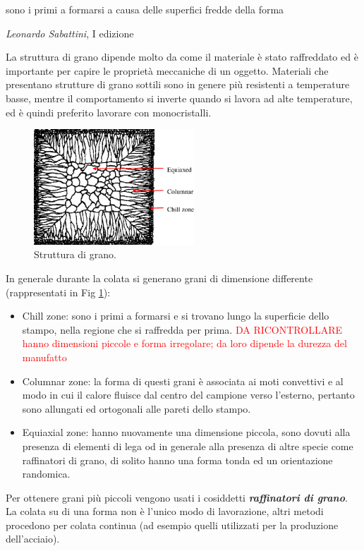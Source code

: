 \epigraph{sono i primi a formarsi a causa delle superfici fredde della forma}{\textit{Leonardo Sabattini}, I edizione}

La struttura di grano dipende molto da come il materiale è stato raffreddato ed è importante per capire le proprietà meccaniche di un oggetto. Materiali che presentano strutture di grano sottili sono in genere più resistenti a temperature basse, mentre il comportamento si inverte quando si lavora ad alte temperature, ed è quindi preferito lavorare con monocristalli.
\begin{figure}[h]
    \centering
    \includegraphics[width=6cm]{struttura/colata_grain.png}
    \caption{Struttura di grano.}
    \label{colata}
\end{figure}
In generale durante la colata si generano grani di dimensione differente (rappresentati in Fig \ref{colata}):
\begin{itemize}
    \item Chill zone: sono i primi a formarsi e si trovano lungo la superficie dello stampo, nella regione che si raffredda per prima. \textcolor{red}{DA RICONTROLLARE hanno dimensioni piccole e forma irregolare; da loro dipende la durezza del manufatto}
    \item Columnar zone: la forma di questi grani è associata ai moti convettivi e al modo in cui il calore fluisce dal centro del campione verso l'esterno, pertanto sono allungati ed ortogonali alle pareti dello stampo.
    \item Equiaxial zone: hanno nuovamente una dimensione piccola, sono dovuti alla presenza di elementi di lega od in generale alla presenza di altre specie come raffinatori di grano, di solito hanno una forma tonda ed un orientazione randomica.
\end{itemize}
Per ottenere grani più piccoli vengono usati i cosiddetti \textbf{\textit{raffinatori di grano}}. La colata su di una forma non è l'unico modo di lavorazione, altri metodi procedono per colata continua (ad esempio quelli utilizzati per la produzione dell'acciaio).
